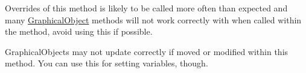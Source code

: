 
\begin{DoxyRefList}
\item[Member \mbox{\hyperlink{classcs110graphics__v2_1_1EventHandler_a642711bb1f5c49ed0f0a1caf05dc14e4}{cs110graphics\+\_\+v2.Event\+Handler.handle\+\_\+mouse\+\_\+enter}} (self, event)]\label{bug__bug000001}%
%
Overrides of this method is likely to be called more often than expected and many \mbox{\hyperlink{classcs110graphics__v2_1_1GraphicalObject}{Graphical\+Object}} methods will not work correctly with when called within the method, avoid using this if possible. 
\item[Member \mbox{\hyperlink{classcs110graphics__v2_1_1EventHandler_ab7da753bd26e28aed9bce86968314ae1}{cs110graphics\+\_\+v2.Event\+Handler.handle\+\_\+mouse\+\_\+press}} (self, event)]\label{bug__bug000002}%
%
Graphical\+Objects may not update correctly if moved or modified within this method. You can use this for setting variables, though.
\end{DoxyRefList}